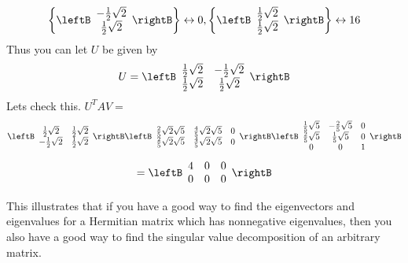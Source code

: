 \begin{equation*}
\left\{ \leftB 
\begin{array}{c}
-\frac{1}{2}\sqrt{2} \\ 
\frac{1}{2}\sqrt{2}
\end{array}
\rightB \right\} \leftrightarrow 0,\left\{ \leftB 
\begin{array}{c}
\frac{1}{2}\sqrt{2} \\ 
\frac{1}{2}\sqrt{2}
\end{array}
\rightB \right\} \leftrightarrow 16
\end{equation*}
Thus you can let $U$ be given by 
\begin{equation*}
U=\leftB 
\begin{array}{cc}
\frac{1}{2}\sqrt{2} & -\frac{1}{2}\sqrt{2} \\ 
\frac{1}{2}\sqrt{2} & \frac{1}{2}\sqrt{2}
\end{array}
\rightB
\end{equation*}
Lets check this. $U^TAV=$ 
\begin{equation*}
\leftB 
\begin{array}{cc}
\frac{1}{2}\sqrt{2} & \frac{1}{2}\sqrt{2} \\ 
-\frac{1}{2}\sqrt{2} & \frac{1}{2}\sqrt{2}
\end{array}
\rightB \leftB  
\begin{array}{ccc}
\frac{2}{5}\sqrt{2}\sqrt{5} & \frac{4}{5}\sqrt{2}\sqrt{5} & 0 \\ 
\frac{2}{5}\sqrt{2}\sqrt{5} & \frac{4}{5}\sqrt{2}\sqrt{5} & 0
\end{array}
\rightB \leftB 
\begin{array}{ccc}
\frac{1}{5}\sqrt{5} & -\frac{2}{5}\sqrt{5} & 0 \\ 
\frac{2}{5}\sqrt{5} & \frac{1}{5}\sqrt{5} & 0 \\ 
0 & 0 & 1
\end{array}
\rightB
\end{equation*}
\begin{equation*}
=\leftB 
\begin{array}{ccc}
4 & 0 & 0 \\ 
0 & 0 & 0
\end{array}
\rightB
\end{equation*}

This illustrates that if you have a good way to find the eigenvectors and
eigenvalues for a Hermitian matrix which has nonnegative eigenvalues, then
you also have a good way to find the singular value decomposition of an
arbitrary matrix.